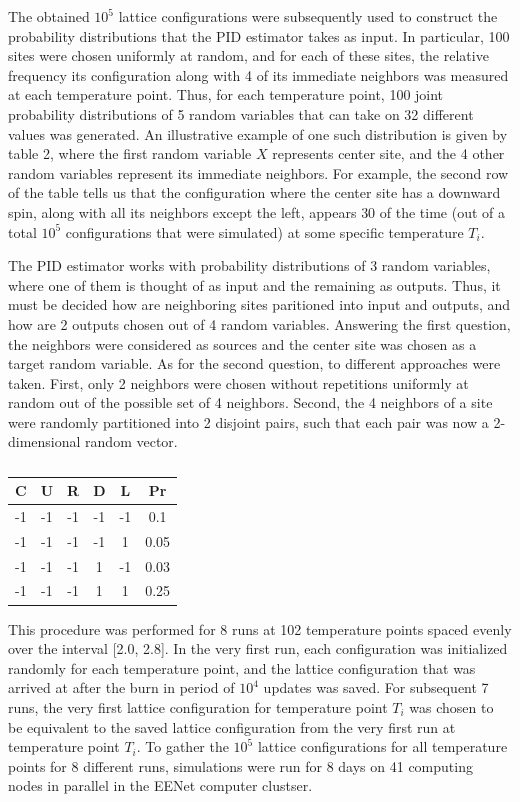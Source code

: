 \documentclass[12pt]{article}
\begin{document}
The obtained $10^5$ lattice configurations were subsequently used to construct the probability distributions that the PID estimator takes as input. In particular, 100 sites were chosen uniformly at random, and for each of these sites, the relative frequency its configuration along with 4 of its immediate neighbors was measured at each temperature point. Thus, for each temperature point, 100 joint probability distributions of 5 random variables that can take on 32 different values was generated. An illustrative example of one such distribution is given by table 2, where the first random variable $X$ represents center site, and the 4 other random variables represent its immediate neighbors. For example, the second row of the table tells us that the configuration where the center site has a downward spin, along with all its neighbors except the left, appears $30$ of the time (out of a total $10^5$ configurations that were simulated) at some specific temperature $T_i$. 

The PID estimator works with probability distributions of 3 random variables, where one of them is thought of as input and the remaining as outputs. Thus, it must be decided how are neighboring sites paritioned into input and outputs, and how are 2 outputs chosen out of 4 random variables. Answering the first question, the neighbors were considered as sources and the center site was chosen as a target random variable. As for the second question, to different approaches were taken. First, only 2 neighbors were chosen without repetitions uniformly at random out of the possible set of 4 neighbors. Second, the 4 neighbors of a site were randomly partitioned into 2 disjoint pairs, such that each pair was now a 2-
dimensional random vector.

\begin{table}[h!]
\centering
\begin{tabular}{|c|c|c|c|c|c|}
	\hline
	C & U & R & D & L & Pr\\ 
	\hline
	-1 & -1 & -1 & -1 & -1 & 0.1 \\
	-1 & -1 & -1 & -1 & 1 & 0.05 \\
	-1 & -1 & -1 & 1 & -1 & 0.03 \\
	-1 & -1 & -1 & 1 & 1 & 0.25 \\
	 
\end{tabular}
\caption{}
\label{table:3}
\end{table}

This procedure was performed for 8 runs at 102 temperature points spaced evenly over the interval [2.0, 2.8]. In the very first run, each configuration was initialized randomly for each temperature point, and the lattice configuration that was arrived at after the burn in period of $10^4$ updates was saved. For subsequent 7 runs, the very first lattice configuration for temperature point $T_i$ was chosen to be equivalent to the saved lattice configuration from the very first run at temperature point $T_i$. To gather the $10^5$ lattice configurations for all temperature points for 8 different runs, simulations were run for 8 days on 41 computing nodes in parallel in the EENet computer clustser.
\end{document}
